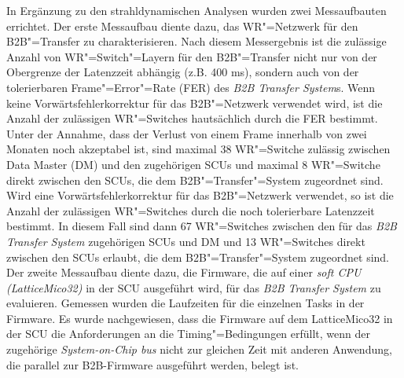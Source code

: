 In Ergänzung zu den strahldynamischen Analysen wurden zwei Messaufbauten errichtet. Der erste Messaufbau diente dazu, das WR"=Netzwerk f\"ur den B2B"=Transfer zu cha­rak­te­ri­sie­ren. Nach diesem Messergebnis ist die zul\"assige Anzahl von WR"=Switch"=Layern f\"ur den B2B"=Transfer nicht nur von der Obergrenze der Latenzzeit abh\"angig (z.B. 400 ms), sondern auch von der tolerierbaren Frame"=Error"=Rate (FER) des \textit{B2B Transfer System}s. Wenn keine Vorw\"artsfehlerkorrektur f\"ur das B2B"=Netzwerk verwendet wird, ist die Anzahl der zul\"assigen WR"=Switches hauts\"achlich durch die FER bestimmt. Unter der Annahme, dass der Verlust von einem Frame innerhalb von zwei Monaten noch akzeptabel ist, sind maximal 38 WR"=Switche zul\"assig zwischen Data Master (DM) und den zugeh\"origen SCUs und maximal 8 WR"=Switche direkt zwischen den SCUs, die dem B2B"=Transfer"=System zugeordnet sind. Wird eine Vorw\"artsfehlerkorrektur f\"ur das B2B"=Netzwerk verwendet, so ist die Anzahl der zul\"assigen WR"=Switches durch die noch tolerierbare Latenzzeit bestimmt. In diesem Fall sind dann 67 WR"=Switches zwischen den f\"ur das \textit{B2B Transfer System} zugeh\"origen SCUs  und DM und 13 WR"=Switches direkt zwischen den SCUs erlaubt, die dem B2B"=Transfer"=System zugeordnet sind. Der zweite Messaufbau diente dazu, die Firmware, die auf einer \textit{soft CPU (LatticeMico32)} in der SCU ausgef\"uhrt wird, f\"ur das \textit{B2B Transfer System} zu evaluieren. Gemessen wurden die Laufzeiten für die einzelnen Tasks in der Firmware. Es wurde nachgewiesen, dass die Firmware auf dem LatticeMico32 in der SCU die Anforderungen an die  Timing"=Bedingungen erfüllt, wenn der zugeh\"orige \textit{System-on-Chip bus} nicht zur gleichen Zeit mit anderen Anwendung, die parallel zur B2B-Firmware ausgef\"uhrt werden, belegt ist.

